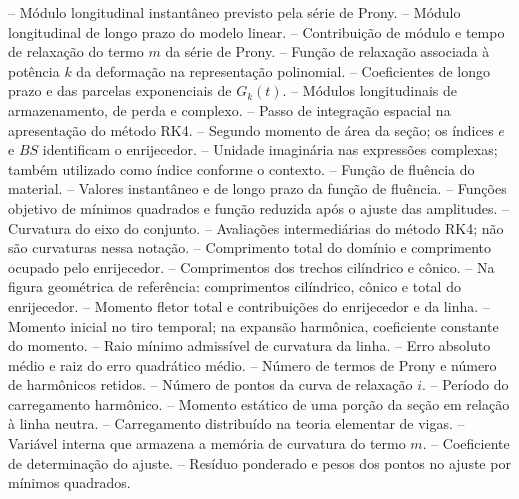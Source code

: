 \documentclass[arial,centeredequations,english,brazilian,oneside,section=TITLE]{ifes8}
\begin{document}
\begin{simbolos}
   -- Módulo longitudinal instantâneo previsto pela série de Prony.
   -- Módulo longitudinal de longo prazo do modelo linear.
   -- Contribuição de módulo e tempo de relaxação do termo $m$ da série de Prony.
   -- Função de relaxação associada à potência $k$ da deformação na representação polinomial.
   -- Coeficientes de longo prazo e das parcelas exponenciais de $G_k(t)$.
   -- Módulos longitudinais de armazenamento, de perda e complexo.
   -- Passo de integração espacial na apresentação do método RK4.
   -- Segundo momento de área da seção; os índices $e$ e $BS$ identificam o enrijecedor.
   -- Unidade imaginária nas expressões complexas; também utilizado como índice conforme o contexto.
   -- Função de fluência do material.
   -- Valores instantâneo e de longo prazo da função de fluência.
   -- Funções objetivo de mínimos quadrados e função reduzida após o ajuste das amplitudes.
   -- Curvatura do eixo do conjunto.
   -- Avaliações intermediárias do método RK4; não são curvaturas nessa notação.
   -- Comprimento total do domínio e comprimento ocupado pelo enrijecedor.
   -- Comprimentos dos trechos cilíndrico e cônico.
   -- Na figura geométrica de referência: comprimentos cilíndrico, cônico e total do enrijecedor.
   -- Momento fletor total e contribuições do enrijecedor e da linha.
   -- Momento inicial no tiro temporal; na expansão harmônica, coeficiente constante do momento.
   -- Raio mínimo admissível de curvatura da linha.
   -- Erro absoluto médio e raiz do erro quadrático médio.
   -- Número de termos de Prony e número de harmônicos retidos.
   -- Número de pontos da curva de relaxação $i$.
   -- Período do carregamento harmônico.
   -- Momento estático de uma porção da seção em relação à linha neutra.
   -- Carregamento distribuído na teoria elementar de vigas.
   -- Variável interna que armazena a memória de curvatura do termo $m$.
   -- Coeficiente de determinação do ajuste.
   -- Resíduo ponderado e pesos dos pontos no ajuste por mínimos quadrados.

\end{simbolos}
\end{document}
